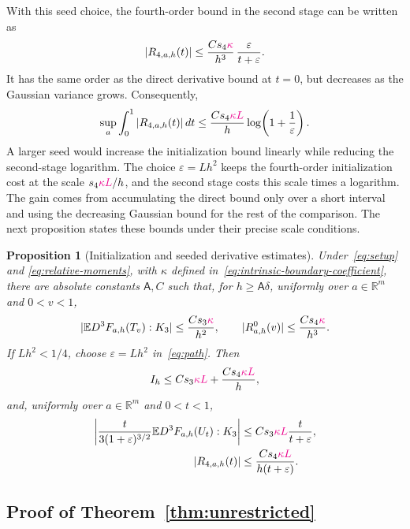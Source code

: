 \documentclass[11pt,letterpaper]{article}
\newcommand{\vSix}[1]{{\color{magenta}#1}}
\newtheorem{proposition}{Proposition}
\theoremstyle{remark}
\newcommand{\E}{\mathbb E}
\newcommand{\R}{\mathbb R}
\begin{document}
{{With this seed choice, the fourth-order bound in the second stage
can be written as
\[
 |R_{4,a,h}(t)|
 \le \frac{Cs_4\vSix{\kappa}}{h^3}\,
       \frac{\varepsilon}{t+\varepsilon}.
\]
It has the same order as the direct derivative bound at \(t=0\),
but decreases as the Gaussian variance grows. Consequently,
\[
 \sup_a\int_0^1|R_{4,a,h}(t)|\,dt
 \le \frac{Cs_4\vSix{\kappa L}}h
       \log\!\left(1+\frac1\varepsilon\right).
\]
A larger seed would increase the initialization bound linearly while
reducing the second-stage logarithm. The choice \(\varepsilon=Lh^2\)
keeps the fourth-order initialization cost at the scale
\(s_4\vSix{\kappa L}/h\), and the second stage costs this scale times a
logarithm. The gain comes from accumulating the direct bound only
over a short interval and using the decreasing Gaussian bound for
the rest of the comparison.
The next proposition states these bounds under their precise
scale conditions.
}

}

\begin{proposition}[Initialization and seeded derivative estimates]
\label{an:prop:derivative}
\vSix{Under~\eqref{eq:setup} and \eqref{eq:relative-moments}, with
\(\kappa\) defined in~\eqref{eq:intrinsic-boundary-coefficient}, there are absolute constants} \(\mathsf A,C\)
such that, for \(h\ge\mathsf A\delta\), uniformly over
\(a\in\R^m\) and \(0<v<1\),
\begin{equation}
 |\E D^3F_{a,h}(T_v):K_3|\le\frac{Cs_3\vSix{\kappa}}{h^2},
 \qquad |R^0_{a,h}(v)|\le\frac{Cs_4\vSix{\kappa}}{h^3}.
 \label{eq:direct-initialization}
\end{equation}
If \(Lh^2<1/4\), choose \(\varepsilon=Lh^2\) in~\eqref{eq:path}.
Then
\begin{equation}
 I_h\le Cs_3 \vSix{\kappa L}+\frac{Cs_4\vSix{\kappa L}}h,
 \label{eq:initialization-bound}
\end{equation}
and, uniformly over \(a\in\R^m\) and \(0<t<1\),
\begin{equation}
 \begin{aligned}
 \left|\frac{t}{3(1+\varepsilon)^{3/2}}
          \E D^3F_{a,h}(U_t):K_3\right|
 &\le Cs_3 \vSix{\kappa L}\frac{t}{t+\varepsilon},\\
 |R_{4,a,h}(t)|&\le\frac{Cs_4\vSix{\kappa L}}{h(t+\varepsilon)}.
 \end{aligned}
 \label{eq:seeded-derivatives}
\end{equation}

\end{proposition}
\subsection{\vSix{Proof of Theorem~\ref*{thm:unrestricted}}}\label{sec:proof-theorem-one}
\end{document}
